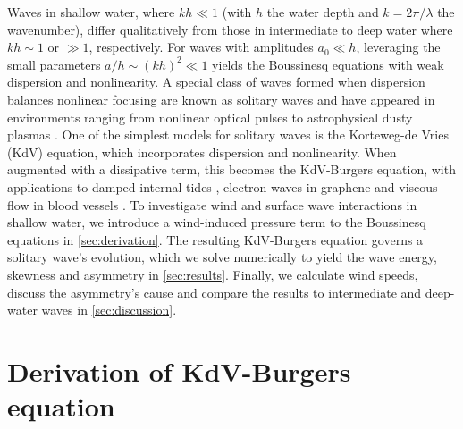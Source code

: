 \documentclass{jfm}
\begin{document}
Waves in shallow water, where $kh \ll 1$ (with $h$ the water depth and
$k=2\pi/\lambda$ the wavenumber), differ qualitatively from those in
intermediate to deep water where $kh \sim 1$ or $\gg 1$, respectively.
For waves with amplitudes $a_0 \ll h$,
leveraging the small parameters $a/h \sim (kh)^2 \ll 1$
yields the Boussinesq equations with weak dispersion and nonlinearity.
A special class of waves formed when dispersion balances nonlinear
focusing are known as solitary waves and have appeared in environments
ranging from nonlinear optical pulses \citep[\eg][]{kivshar1993dark} to
astrophysical dusty plasmas \citep[\eg][]{sahu2012nonextensive}.
One of the simplest models for solitary waves is the Korteweg-de Vries
(KdV) equation, which incorporates dispersion and nonlinearity.
When augmented with a dissipative term, this becomes the KdV-Burgers
equation, with applications to damped internal tides
\citep[\eg][]{sandstrom1995dissipation}, electron waves in graphene
\citep[\eg][]{zdyrski2019effects} and viscous flow in blood vessels
\citep[\eg][]{antar1999weakly}.
To investigate wind and surface wave interactions in shallow water, we
introduce a wind-induced pressure term to the Boussinesq equations in
\cref{sec:derivation}.
The resulting KdV-Burgers equation governs a solitary wave's evolution,
which we solve numerically to yield the wave energy, skewness and
asymmetry in \cref{sec:results}.
Finally, we calculate wind speeds, discuss the asymmetry's cause and
compare the results to intermediate and deep-water waves in
\cref{sec:discussion}.

\section{\label{sec:derivation} Derivation of KdV-Burgers equation}
\end{document}
